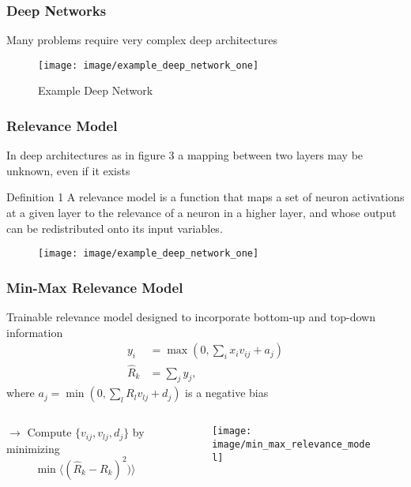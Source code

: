 \documentclass{beamer}
\begin{document}
\begin{frame}
\frametitle{Deep Networks}
Many problems require very complex deep architectures

\begin{figure}
\label{fig1}
\texttt{[image: image/example\_deep\_network\_one]}
\vspace{-0.25cm}
\caption{Example Deep Network}

\end{figure}

\vspace{-1cm}
\end{frame}


\begin{frame}
\frametitle{Relevance Model}
\vspace{0.25cm}
In deep architectures as in figure 3 a mapping between two layers may be unknown, even if it exists
\begin{block}{Definition 1}
A relevance model is a function that maps a set of neuron activations at a given layer to the relevance of a neuron in a higher layer, and whose output can be redistributed onto its input variables.
\end{block}

\begin{figure}
\label{fig1}
\texttt{[image: image/example\_deep\_network\_one]}
\end{figure}
\vspace{-0.5cm}
\end{frame}


\begin{frame}
\frametitle{Min-Max Relevance Model}
\vspace{0.4cm}
Trainable relevance model designed to incorporate bottom-up and top-down information
\begin{align*}
y_i &= \max(0,\sum_ix_iv_{ij} + a_j)\\
\hat{R}_k &= \sum_j y_j,
\end{align*}
where $a_j = \min(0,\sum_l R_l v_{lj} + d_j)$ is a negative bias
\vspace{-0.25cm}


 \begin{columns}
          \begin{column}{5cm}
          		$\rightarrow$ Compute $\{v_{ij}, v_{lj},d_j\}$ by minimizing 
			\begin{equation*}
			\min\langle (\hat{R}_k-R_k)^2) \rangle
			\end{equation*}
            \end{column} 
            \begin{column}{6cm}
			\begin{figure}
			\label{fig1}
			\texttt{[image: image/min\_max\_relevance\_model]}
			\end{figure}
	\end{column}
\end{columns} 

\end{frame}
\end{document}
